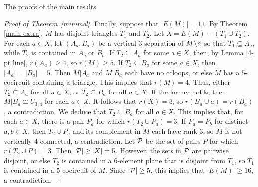 \documentclass[12pt]{amsart}
\begin{document}
\begin{section}{The proofs of the main results}
\begin{proof}[Proof of Theorem~\ref{minimal}]

Finally, suppose that $|E(M)| = 11$.
By Theorem \ref{main extra}, $M$ has disjoint triangles $T_1$ and $T_2$.
Let $X = E(M) - (T_1 \cup T_2)$.
For each $a \in X$, let $(A_a, B_a)$ be a vertical $3$-separation of $M \!\setminus\! a$ so that $T_1 \subseteq A_a$,  while $T_2$ is contained in $A_a$ or $B_a$.
If $T_2 \subseteq A_a$ for some $a \in X$, then, by Lemma \ref{4-pt line}, $r(A_a) \ge 4$, so $r(M) \ge 5$.
If $T_2 \subseteq B_a$ for some $a \in X$, then $|A_a| = |B_a| = 5$.
Then $M|A_a$ and $M|B_a$ each have no coloops, or else $M$ has a $5$-cocircuit containing a triangle.
This implies that $r(M) = 4$.
Thus, either $T_2 \subseteq A_a$ for all $a \in X$, or $T_2 \subseteq B_a$ for all $a \in X$.
If the former holds, then $M|B_a \cong U_{3,4}$ for each $a \in X$.
It follows that $r(X) = 3$, so $r(B_a \cup a) = r(B_a)$, a contradiction.
We deduce that $T_2 \subseteq B_a$ for all $a \in X$.
This implies that, for each $a \in X$, there is a pair $P_a$ for which $r(T_2 \cup P_a) = 3$.
If $P_a = P_b$ for distinct $a,b \in X$, then $T_2 \cup P_a$ and its complement in $M$ each have rank $3$, so $M$ is not vertically $4$-connected, a contradiction.
Let $\mathcal{P}$ be the set of pairs $P$ for which $r(T_2 \cup P) = 3$.
Then $|\mathcal{P}| \ge |X| = 5$.
However, the sets in $\mathcal{P}$ are pairwise disjoint, or else $T_2$ is contained in a $6$-element plane that is disjoint from $T_1$, so $T_1$ is contained in a $5$-cocircuit of $M$.
Since $|\mathcal{P}| \ge 5$, this implies that $|E(M)| \ge 16$, a contradiction.
\end{proof}


\end{section}






\end{document}
